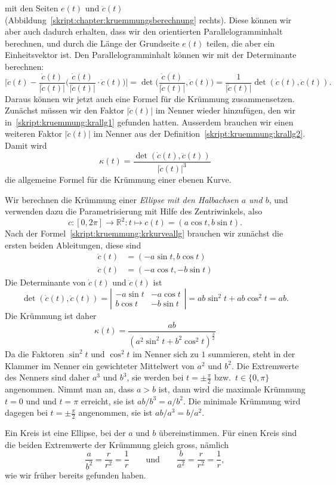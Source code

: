 mit den Seiten $e(t)$ und $\ddot c(t)$
(Abbildung~\ref{skript:chapter:kruemmungsberechnung} rechts).
Diese können wir aber auch dadurch erhalten, dass wir den orientierten
Parallelogramminhalt berechnen, und durch die Länge der Grundseite
$e(t)$ teilen, die aber ein Einheitsvektor ist.
Den Parallelogramminhalt können wir mit der Determinante berechnen:
\[
\biggl|\ddot c(t) - \frac{\dot c(t)}{|\dot c(t)|}
\biggl(\frac{\dot c(t)}{|\dot c(t)|} \cdot \ddot c(t)\biggr)\biggr|
=
\det \biggl(\frac{\dot c(t)}{|\dot c(t)|}, \ddot c(t)\biggr)
=
\frac1{|\dot c(t)|}\det (\dot c(t),\ddot c(t)).
\]
Daraus können wir jetzt auch eine Formel für die Krümmung zusammensetzen.
Zunächst müssen wir den Faktor $|\dot c(t)|$ im Nenner wieder
hinzufügen, den wir in~\eqref{skript:kruemmung:krallg1} gefunden hatten.
Ausserdem brauchen wir einen weiteren Faktor $|\dot c(t)|$ im Nenner
aus der Definition~\eqref{skript:kruemmung:krallg2}.
Damit wird
\begin{equation}
\kappa(t)
=
\frac{\det(\dot c(t),\ddot c(t))}{|\dot c(t)|^3}
\label{skript:kruemmung:krkurveallg}
\end{equation}
die allgemeine Formel für die Krümmung einer ebenen Kurve.


\begin{beispiel}
%
Wir berechnen die Krümmung einer {\em Ellipse mit den Halbachsen
$a$ und $b$}, und verwenden dazu die Parametrisierung mit Hilfe des
Zentriwinkels, also
\[
c
\colon
[0,2\pi]\to\mathbb R^2
\colon
t\mapsto c(t) = (a\cos t, b \sin t).
\]
Nach der Formel~\eqref{skript:kruemmung:krkurveallg} brauchen wir zunächst
die ersten beiden Ableitungen, diese sind
\begin{align*}
\dot c(t)
&=
(-a\sin t, b\cos t)
\\
\ddot c(t)
&=
(-a\cos t, -b\sin t)
\end{align*}
Die Determinante von $\dot c(t)$ und $\ddot c(t)$ ist
\[
\det(\dot c(t), \ddot c(t))
=
\left|\begin{matrix}
-a\sin t & -a \cos t\\
 b\cos t & -b \sin t
\end{matrix}\right|
=
ab\sin^2t+ab\cos^2 t
=
ab.
\]
Die Krümmung ist daher
\[
\kappa(t)
=
\frac{ab}{(a^2\sin^2 t + b^2 \cos^2 t)^{\frac32}}
\]
Da die Faktoren $\sin^2t$ und $\cos^2t$ im Nenner sich zu $1$ summieren,
steht in der Klammer im Nenner ein gewichteter Mittelwert von $a^2$
und $b^2$.
Die Extremwerte des Nenners sind daher $a^3$ und $b^3$, sie werden bei
$t=\pm\frac{\pi}2$ bzw.~$t\in\{0,\pi\}$ angenommen.
Nimmt man an, dass $a>b$ ist, dann wird die maximale Krümmung $t=0$ und
und $t=\pi$ erreicht, sie ist $ab/b^3=a/b^2$.
Die minimale Krümmung wird dagegen bei $t=\pm\frac{\pi}2$ angenommen,
sie ist $ab/a^3=b/a^2$.

Ein Kreis ist eine Ellipse, bei der $a$ und $b$ übereinstimmen.
Für einen Kreis sind die beiden Extremwerte der Krümmung
gleich gross, nämlich
\[
\frac{a}{b^2}=\frac{r}{r^2}=\frac1r
\qquad\text{und}\qquad
\frac{b}{a^2}=\frac{r}{r^2}=\frac1r,
\]
wie wir früher bereits gefunden haben.
\end{beispiel}

